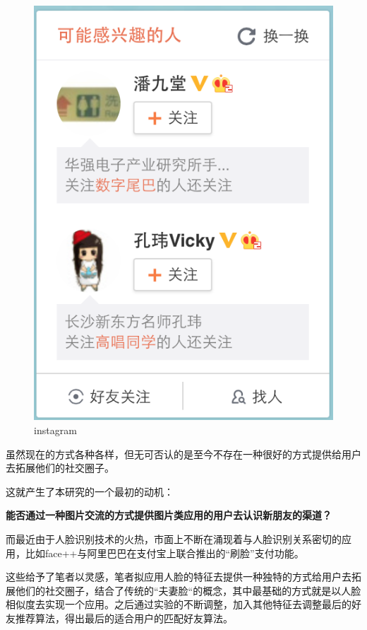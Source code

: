 \begin{figure}[h]
\begin{minipage}[t]{0.45\linewidth}
\includegraphics[width=\textwidth]{img/chap1/weibo_recommend.png}
\caption{instagram\label{weibo推荐}}
\end{minipage}

\end{figure}
虽然现在的方式各种各样，但无可否认的是至今不存在一种很好的方式提供给用户去拓展他们的社交圈子。

这就产生了本研究的一个最初的动机：

 \textbf{能否通过一种图片交流的方式提供图片类应用的用户去认识新朋友的渠道？}

而最近由于人脸识别技术的火热，市面上不断在涌现着与人脸识别关系密切的应用，比如face++与阿里巴巴在支付宝上联合推出的“刷脸”支付功能。

这些给予了笔者以灵感，笔者拟应用人脸的特征去提供一种独特的方式给用户去拓展他们的社交圈子，结合了传统的“夫妻脸“的概念，其中最基础的方式就是以人脸相似度去实现一个应用。之后通过实验的不断调整，加入其他特征去调整最后的好友推荐算法，得出最后的适合用户的匹配好友算法。
